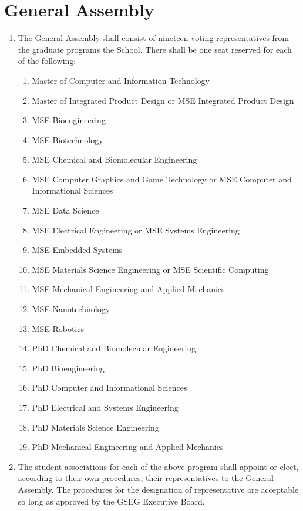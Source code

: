\chapter{General Assembly}
\label{art:assembly}

\begin{enumerate}[label=\Alph*.]

	\item The General Assembly shall consist of nineteen voting representatives from the graduate programs the School. There shall be one seat reserved for each of the following:
	\begin{enumerate}[label=(\roman*)]
		\item Master of Computer and Information Technology
		\item Master of Integrated Product Design or MSE Integrated Product Design
		\item MSE Bioengineering
		\item MSE Biotechnology
		\item MSE Chemical and Biomolecular Engineering
		\item MSE Computer Graphics and Game Technology or MSE Computer and Informational Sciences
		\item MSE Data Science
		\item MSE Electrical Engineering or MSE Systems Engineering
		\item MSE Embedded Systems
		\item MSE Materials Science Engineering or MSE Scientific Computing
		\item MSE Mechanical Engineering and Applied Mechanics
		\item MSE Nanotechnology
		\item MSE Robotics
		\item PhD Chemical and Biomolecular Engineering
		\item PhD Bioengineering
		\item PhD Computer and Informational Sciences
		\item PhD Electrical and Systems Engineering
		\item PhD Materials Science Engineering
		\item PhD Mechanical Engineering and Applied Mechanics
	\end{enumerate}

	\item The student associations for each of the above program shall appoint or elect, according
	to their own procedures, their representatives to the General Assembly. The procedures for the
	designation of representative are acceptable so long as approved by the GSEG Executive Board.


\end{enumerate}
